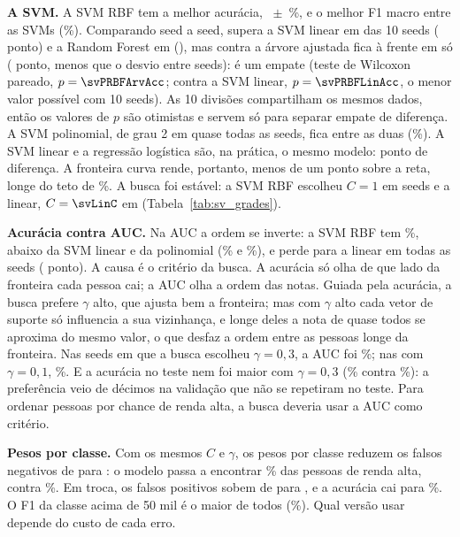 \textbf{A SVM.} A SVM RBF tem a melhor acurácia, \svRBFAcc~$\pm$~\svRBFSd\%, e o melhor F1 macro entre as SVMs (\svRBFFum\%). Comparando seed a seed, supera a SVM linear em \svSeedsRBFLinAcc{} das 10 seeds (\svDifRBFLinAcc{} ponto) e a Random Forest em \svSeedsRBFRFAcc{} (\svDifRBFRFAcc), mas contra a árvore ajustada fica à frente em só \svSeedsRBFArvAcc{} (\svDifRBFArvAcc{} ponto, menos que o desvio entre seeds): é um empate (teste de Wilcoxon pareado, $p = \svPRBFArvAcc$; contra a SVM linear, $p = \svPRBFLinAcc$, o menor valor possível com 10 seeds). As 10 divisões compartilham os mesmos dados, então os valores de $p$ são otimistas e servem só para separar empate de diferença. A SVM polinomial, de grau 2 em quase todas as seeds, fica entre as duas (\svPoliAcc\%). A SVM linear e a regressão logística são, na prática, o mesmo modelo: \svDifLinLogAcc{} ponto de diferença. A fronteira curva rende, portanto, menos de um ponto sobre a reta, longe do teto de \svTeto\%. A busca foi estável: a SVM RBF escolheu $C = 1$ em \svRBFCUmSeeds{} seeds e a linear, $C = \svLinC$ em \svLinCSeeds{} (Tabela~\ref{tab:sv_grades}).

\textbf{Acurácia contra AUC.} Na AUC a ordem se inverte: a SVM RBF tem \svRBFAuc\%, abaixo da SVM linear e da polinomial (\svLinAuc\% e \svPoliAuc\%), e perde para a linear em todas as seeds (\svDifRBFLinAuc{} ponto). A causa é o critério da busca. A acurácia só olha de que lado da fronteira cada pessoa cai; a AUC olha a ordem das notas. Guiada pela acurácia, a busca prefere $\gamma$ alto, que ajusta bem a fronteira; mas com $\gamma$ alto cada vetor de suporte só influencia a sua vizinhança, e longe deles a nota de quase todos se aproxima do mesmo valor, o que desfaz a ordem entre as pessoas longe da fronteira. Nas \svGTresSeeds{} seeds em que a busca escolheu $\gamma = 0{,}3$, a AUC foi \svGTresAuc\%; nas \svGUmSeeds{} com $\gamma = 0{,}1$, \svGUmAuc\%. E a acurácia no teste nem foi maior com $\gamma = 0{,}3$ (\svGTresAcc\% contra \svGUmAcc\%): a preferência veio de décimos na validação que não se repetiram no teste. Para ordenar pessoas por chance de renda alta, a busca deveria usar a AUC como critério.

\textbf{Pesos por classe.} Com os mesmos $C$ e $\gamma$, os pesos por classe reduzem os falsos negativos de \svRBFFN{} para \svPesosFN: o modelo passa a encontrar \svRecallPesos\% das pessoas de renda alta, contra \svRecallRBF\%. Em troca, os falsos positivos sobem de \svRBFFP{} para \svPesosFP, e a acurácia cai para \svPesosAcc\%. O F1 da classe acima de 50 mil é o maior de todos (\svPesosFpos\%). Qual versão usar depende do custo de cada erro.

